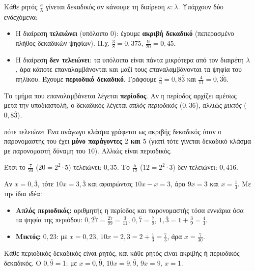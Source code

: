
Κάθε ρητός $\frac{\kappa}{\lambda}$ γίνεται δεκαδικός αν κάνουμε τη διαίρεση $\kappa:\lambda$. Υπάρχουν δύο ενδεχόμενα:

\begin{itemize}[leftmargin=1.2em,itemsep=0.3ex,topsep=2pt]
\item Η διαίρεση \textbf{τελειώνει} (υπόλοιπο $0$): έχουμε \textbf{ακριβή δεκαδικό} (πεπερασμένο πλήθος δεκαδικών ψηφίων). Π.χ. $\frac{3}{8}=0{,}375$, $\frac{9}{20}=0{,}45$.
\item Η διαίρεση \textbf{δεν τελειώνει}: τα υπόλοιπα είναι πάντα μικρότερα από τον διαιρέτη $\lambda$, άρα κάποτε επαναλαμβάνονται και μαζί τους επαναλαμβάνονται τα ψηφία του πηλίκου. Έχουμε \textbf{περιοδικό δεκαδικό}. Γράφουμε $\frac{5}{6}=0{,}8\overline{3}$ και $\frac{4}{11}=0{,}\overline{36}$.
\end{itemize}

Το τμήμα που επαναλαμβάνεται λέγεται \textbf{περίοδος}. Αν η περίοδος αρχίζει αμέσως μετά την υποδιαστολή, ο δεκαδικός λέγεται \emph{απλός περιοδικός} ($0{,}\overline{36}$), αλλιώς \emph{μικτός} ($0{,}8\overline{3}$).

\begin{kanonas}{πότε τελειώνει}
Ένα ανάγωγο κλάσμα γράφεται ως ακριβής δεκαδικός όταν ο παρονομαστής του έχει \textbf{μόνο παράγοντες $2$ και $5$} (γιατί τότε γίνεται δεκαδικό κλάσμα με παρονομαστή δύναμη του $10$). Αλλιώς είναι περιοδικός.
\end{kanonas}

Έτσι το $\frac{7}{20}$ ($20=2^2\cdot5$) τελειώνει: $0{,}35$. Το $\frac{5}{12}$ ($12=2^2\cdot3$) δεν τελειώνει: $0{,}41\overline{6}$.


Αν $x=0{,}\overline{3}$, τότε $10x=3{,}\overline{3}$ και αφαιρώντας $10x-x=3$, άρα $9x=3$ και $x=\frac{1}{3}$. Με την ίδια ιδέα:
\begin{itemize}[leftmargin=1.2em,itemsep=0.3ex,topsep=2pt]
\item \textbf{Απλός περιοδικός:} αριθμητής η περίοδος και παρονομαστής τόσα εννιάρια όσα τα ψηφία της περιόδου: $0{,}\overline{27}=\frac{27}{99}=\frac{3}{11}$, $0{,}\overline{7}=\frac{7}{9}$, $1{,}\overline{3}=1+\frac{3}{9}=\frac{4}{3}$.
\item \textbf{Μικτός:} $0{,}2\overline{3}$: με $x=0{,}2\overline{3}$, $10x=2{,}\overline{3}=2+\frac{1}{3}=\frac{7}{3}$, άρα $x=\frac{7}{30}$.
\end{itemize}
Κάθε περιοδικός δεκαδικός είναι ρητός, και κάθε ρητός είναι ακριβής ή περιοδικός δεκαδικός. Ο $0{,}\overline{9}=1$: με $x=0{,}\overline{9}$, $10x=9{,}\overline{9}$, $9x=9$, $x=1$.

